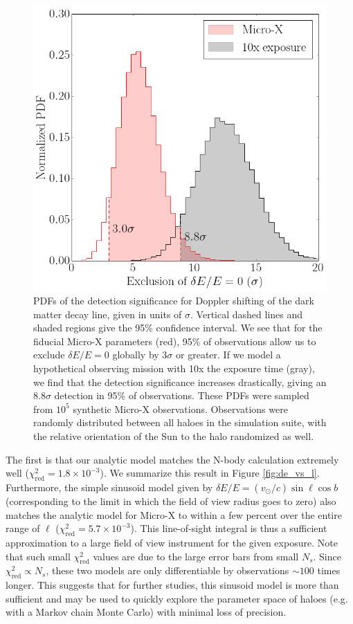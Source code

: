 \documentclass[aps,prd,10pt,twocolumn,superscriptaddress,showpacs,footinbib]{revtex4-1}
\begin{document}
\begin{figure}[h!]
\centering
\includegraphics[width=1.0\columnwidth]{sig_pdf.png}
\caption{ 
	PDFs of the detection significance for Doppler shifting of the dark matter decay line, given in
	units of $\sigma$. Vertical dashed lines and shaded regions give the 95\% confidence interval.
	We see that for the fiducial Micro-X parameters (red), 95\% of observations allow us to exclude
	$\delta E/E=0$ globally by $3\sigma$ or greater. If we model a hypothetical observing mission with
	10x the exposure time (gray), we find that the detection significance increases drastically, giving an
	$8.8\sigma$ detection in 95\% of observations. 
	These PDFs were sampled from $10^5$ synthetic Micro-X observations. Observations were randomly distributed
	between all haloes in the simulation suite, with the relative orientation of the Sun to the halo
	randomized as well. 
}
\label{fig:sigma_pdf}
\end{figure}


The first is that our analytic model matches the N-body calculation
extremely well ($\chi^2_\mathrm{red}=1.8\times 10^{-3}$).  We summarize this result in Figure
\ref{fig:de_vs_l}. Furthermore, the simple sinusoid model given by $\delta E/E
= (v_\odot/c) \sin \ell \cos b$ (corresponding to the limit in which the field of view radius goes to
zero) also matches the analytic model for Micro-X to within a few percent over the entire range of
$\ell$ ($\chi^2_\mathrm{red}=5.7\times 10^{-3}$). This line-of-sight integral is thus
a sufficient approximation to a large field of view instrument for the given exposure. 
Note that such small $\chi^2_\mathrm{red}$ values are due to the large error bars from small $N_s$.
Since $\chi^2_\mathrm{red} \propto N_s$, these two models are 
only differentiable by observations $\sim 100$ times longer.  
This suggests that for further studies, this sinusoid model is more than sufficient and may be
used to quickly explore the parameter space of haloes (e.g. with a Markov chain Monte Carlo) with minimal loss of precision.
\end{document}
